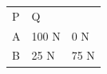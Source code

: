 \begin{enumerate}[noitemsep, label=\textbf{\arabic*}. ]
{\begin{tabular}[t]{|l|l|l|}
    
        P &
    
    
        Q%
     \tabularnewline\cline{1-1}\cline{2-2}\cline{3-3}
    
    
        A &
    
    
        100 N &
    
    
        0 N%
     \tabularnewline\cline{1-1}\cline{2-2}\cline{3-3}
    
    
        B &
    
    
        25 N &
    
    
        75 N%
     \tabularnewline\cline{1-1}\cline{2-2}\cline{3-3}
    

\end{tabular}}
\end{enumerate}
